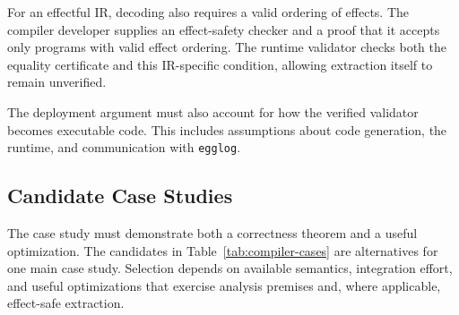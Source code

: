 For an effectful IR, decoding also requires a valid ordering of effects.
The compiler developer supplies an effect-safety checker
  and a proof that it accepts only programs with valid effect ordering.
The runtime validator checks both the equality certificate and this IR-specific condition,
  allowing extraction itself to remain unverified.

The deployment argument must also account for how the verified validator becomes executable code.
This includes assumptions about code generation, the runtime, and communication with \texttt{egglog}.

\subsection{Candidate Case Studies}
\label{sec:verified-case-studies}

The case study must demonstrate both a correctness theorem and a useful optimization.
The candidates in Table~\ref{tab:compiler-cases} are alternatives for one main case study.
Selection depends on available semantics, integration effort, and useful optimizations
  that exercise analysis premises and, where applicable, effect-safe extraction.

